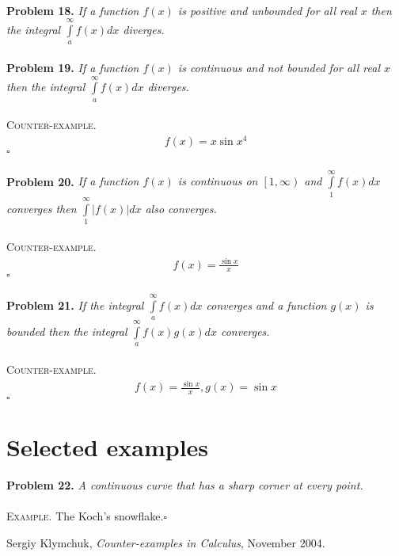 \documentclass[a4paper]{article}
\numberwithin{equation}{section}
\begin{document}
\\
\textbf{Problem 18.} \textit{If a function $ f(x)$ is positive and unbounded for all real $x$ then the integral $\int\limits_a^\infty  {f\left( x \right)dx} $ diverges.}\\
\\
\textbf{Problem 19.} \textit{If a function $ f(x)$ is continuous and not bounded for all real $x$ then the integral $\int\limits_a^\infty  {f\left( x \right)dx} $ diverges.}\\
\\
\textsc{Counter-example.} 
\begin{align}
f\left( x \right) = x\sin {x^4}
\end{align}
\hfill $\square$\\
\\
\textbf{Problem 20.} \textit{If a function $ f(x)$ is continuous on $\left[ {1,\infty } \right)$ and  $\int\limits_1^\infty  {f\left( x \right)dx} $ converges then $\int\limits_1^\infty  {\left| {f\left( x \right)} \right|dx} $ also converges.}\\
\\
\textsc{Counter-example.} 
\begin{align}
f\left( x \right) = \frac{{\sin x}}{x}
\end{align}
\hfill $\square$\\
\\
\textbf{Problem 21.} \textit{If the integral $\int\limits_a^\infty  {f\left( x \right)dx} $ converges and a function $g(x)$ is bounded then the integral $\int\limits_a^\infty  {f\left( x \right)} g\left( x \right)dx$ converges. }\\
\\
\textsc{Counter-example.} 
\begin{align}
f\left( x \right) = \frac{{\sin x}}{x},g\left( x \right) = \sin x
\end{align}
\hfill $\square$
\section{Selected examples}
\textbf{Problem 22.} \textit{A continuous curve that has a sharp corner at every point.}\\
\\
\textsc{Example.} The Koch's snowflake.\hfill $\square$\\
\newpage
\begin{thebibliography}{9}
 Sergiy Klymchuk, \textit{Counter-examples in Calculus}, November 2004.
\end{thebibliography}
\end{document}
